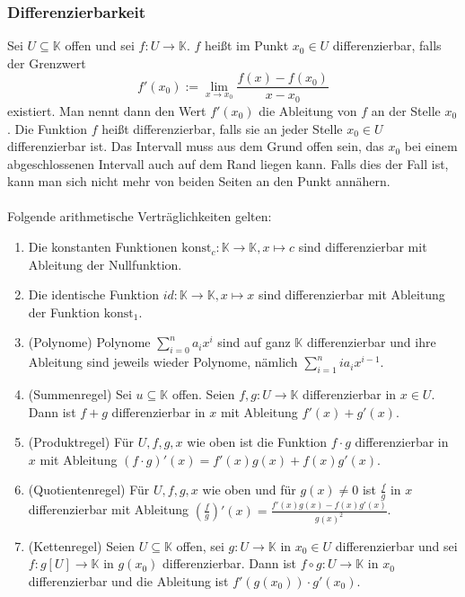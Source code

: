 \documentclass[a4paper,12pt]{article}
\begin{document}
\subsubsection{Differenzierbarkeit}
Sei $U\subseteq \mathbb{K}$ offen und sei $f:U\rightarrow \mathbb{K}$. $f$ heißt im Punkt $x_0 \in U$ differenzierbar, falls der Grenzwert 
\[ 
        f'\left(x_0\right):=\lim_{x\rightarrow x_0}\dfrac{f\left(x\right)-f\left(x_0\right)}{x-x_0}
\] 
existiert. Man nennt dann den Wert $f'\left(x_0\right)$ die Ableitung von $f$ an der Stelle $x_0$. Die Funktion $f$ heißt differenzierbar, falls sie an jeder Stelle $x_0 \in U$ differenzierbar ist. Das Intervall muss aus dem Grund offen sein, das $x_0$ bei einem abgeschlossenen Intervall auch auf dem Rand liegen kann. Falls dies der Fall ist, kann man sich nicht mehr von beiden Seiten an den Punkt annähern.\\\\
Folgende arithmetische Verträglichkeiten gelten:
\begin{enumerate}[label=(\alph*)]
        \item Die konstanten Funktionen $\text{konst}_c:\mathbb{K}\rightarrow \mathbb{K},x\mapsto c$ sind differenzierbar mit Ableitung der Nullfunktion.
        \item Die identische Funktion $id:\mathbb{K}\rightarrow \mathbb{K},x\mapsto x$ sind differenzierbar mit Ableitung der Funktion $\text{konst}_1$.
        \item (Polynome) Polynome $\sum_{i=0}^{n}a_ix^i$ sind auf ganz $\mathbb{K}$ differenzierbar und ihre Ableitung sind jeweils wieder Polynome, nämlich $\sum_{i=1}^{n}ia_ix^{i-1}$.
        \item (Summenregel) Sei $u\subseteq \mathbb{K}$ offen. Seien $f,g:U\rightarrow \mathbb{K}$ differenzierbar in $x \in U$. Dann ist $f+g$ differenzierbar in $x$ mit Ableitung $f'\left(x\right)+g'\left(x\right)$.
        \item (Produktregel) Für $U,f,g,x$ wie oben ist die Funktion $f\cdot g$ differenzierbar in $x$ mit Ableitung $\left(f\cdot g\right)'\left(x\right)=f'\left(x\right)g\left(x\right)+f\left(x\right)g'\left(x\right)$.
        \item (Quotientenregel) Für $U,f,g,x$ wie oben und für $g\left(x\right)\neq 0$ ist $\tfrac{f}{g}$ in $x$ differenzierbar mit Ableitung $\left(\tfrac{f}{g}\right)'\left(x\right)=\tfrac{f'\left(x\right)g\left(x\right)-f\left(x\right)g'\left(x\right)}{g\left(x\right)^2}$.
        \item (Kettenregel) Seien $U\subseteq \mathbb{K}$ offen, sei $g:U\rightarrow \mathbb{K}$ in $x_0 \in U$ differenzierbar und sei $f:g[U]\rightarrow \mathbb{K}$ in $g\left(x_0\right)$ differenzierbar. Dann ist $f\circ g:U\rightarrow \mathbb{K}$ in $x_0$ differenzierbar und die Ableitung ist $f'\left(g\left(x_0\right)\right)\cdot g'\left(x_0\right)$.
\end{enumerate}
\end{document}
